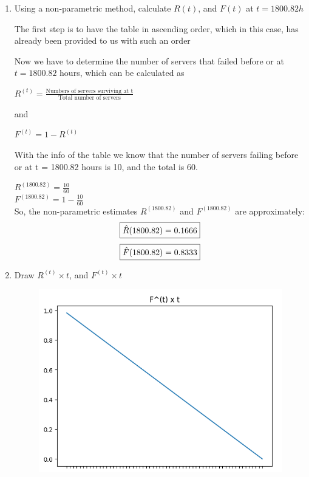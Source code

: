 \documentclass{article}
\begin{document}
\begin{enumerate}[label=(\alph*)]
    \item Using a non-parametric method, calculate $R(t)$, and $F(t)$ at $t = 1800.82h$
    \begin{flushleft}
            The first step is to have the table in ascending order, which in this case, has already been provided to us with such an order

            Now we have to determine the number of servers that failed before or at $t = 1800.82$ hours, which can be calculated as

            \(R^(t) = \frac{\text{Numbers of servers surviving at t}}{\text{Total number of servers}}\)

            and 
            
            \(F^(t) = 1 - R^(t)\)

            With the info of the table we know that the number of servers failing before or at t = 1800.82 hours is 10, and the total is 60.

            \(R^(1800.82) = \frac{10}{60}\)  \\

            \(F^(1800.82) = 1 - \frac{10}{60}\) \\

        
            So, the non-parametric estimates $R^(1800.82)$ and $F^(1800.82)$ are approximately:
            \[\fbox{$\hat{R}(1800.82) = 0.1666$}\]
            \[\fbox{$\hat{F}(1800.82) = 0.8333$}\]

        \end{flushleft}

    \item Draw $R^(t) \times t$, and $F^(t) \times t$
        \begin{figure}[H]
            \centering
            \includegraphics[width=0.7\linewidth]{ft_q3.png}
            \label{fig:F^(t) x t}
        \end{figure}


\end{enumerate}
\end{document}
